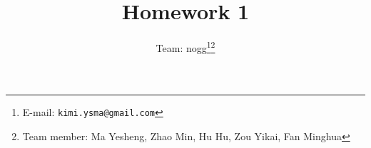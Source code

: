 \documentclass[12pt, notitlepage]{article}
\title{Homework 1}
\author{Team: nogg\footnote{E-mail: \texttt{kimi.ysma@gmail.com}}\footnote{Team member: Ma Yesheng, Zhao Min, Hu Hu, Zou Yikai, Fan Minghua}}
\newtheorem{ex}{Exercise}
\newenvironment{sol}
  {\par\vspace{3mm}\noindent{\it Solution}.}
\begin{document}
{\bf\small CS214: Algorithms and Complexity}\hfill{\bf\small 2016 Fall}
{\let\newpage\relax\maketitle}





\begin{ex}\rm
\end{ex}

\begin{sol}
	\ \\ \\
	Pseudocode:
	
	\begin{lstlisting}
	function binomialCoefficient:
		if k < 0 or k > n: return 0;
		if k == 0 or k == n: return 1;
		return C(n-1, k-1) + C(n-1, k);
	\end{lstlisting}
	\ \\
	Python code:
	\begin{lstlisting}[language=Python]
	def biCoef(n, k):
		if k < 0 or k > n:
        	return 0
    	if k == 0 or k == n:
			return 1
    	return biCoef(n-1, k) + biCoef(n-1, k-1)
	\end{lstlisting}
	\ \\
	The running time is $O(C(n,\ k))$.Actually, it takes C(n, k)-1 times of addition.\\
	It may be quite efficient when k comes very close to zero or n, while it's not when k is close to $[n/2]$. \\
	
\end{sol}

\begin{ex}\rm
\end{ex}
\end{document}
